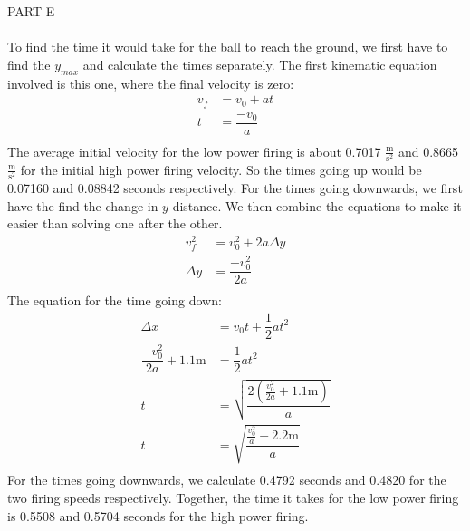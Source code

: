 \documentclass [12pt, letterpaper, twoside] {article}
\begin{document}
\noindent
PART E \\\\
To find the time it would take for the ball to reach the ground, we first have to find the \(y_{max}\) and calculate the times separately. The first kinematic equation involved is this one, where the final velocity is zero:
\begin {equation}
  \begin {split}
    v_{f} & = v_{0} + at \\
    t & = \dfrac{-v_{0}}{a} \\
  \end {split}
\end {equation}
The average initial velocity for the low power firing is about 0.7017 \(\tfrac{\text{m}}{\text{s}^2}\) and 0.8665 \(\tfrac{\text{m}}{\text{s}^2}\) for the initial high power firing velocity. So the times going up would be 0.07160 and 0.08842 seconds respectively. For the times going downwards, we first have the find the change in \(y\) distance. We then combine the equations to make it easier than solving one after the other.
\begin {equation}
  \begin {split}
    v_{f}^2 & = v_{0}^2 + 2a\Delta{y} \\
    \Delta{y} & = \dfrac{-v_{0}^2}{2a} \\
  \end {split}
\end {equation}
The equation for the time going down:
\begin {equation}
  \begin {split}
    \Delta{x} & = v_{0}t+\dfrac{1}{2}at^2 \\
    \dfrac{-v_{0}^2}{2a}+1.1\text{m} & = \dfrac{1}{2}at^2 \\
    t & = \sqrt{\dfrac{2(\tfrac{v_{0}^2}{2a}+1.1\text{m})}{a}} \\
    t & = \sqrt{\dfrac{\tfrac{v_{0}^2}{a}+2.2\text{m}}{a}} \\
  \end {split}
\end {equation}
For the times going downwards, we calculate 0.4792 seconds and 0.4820 for the two firing speeds respectively. Together, the time it takes for the low power firing is 0.5508 and 0.5704 seconds for the high power firing.
\end{document}

